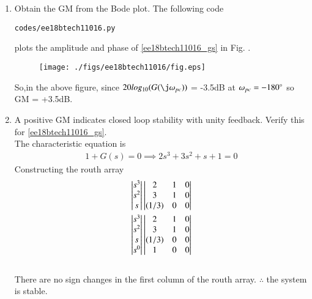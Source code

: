 \begin{enumerate}[label=\thesection.\arabic*.,ref=\thesection.\theenumi]
\item Obtain the GM from the Bode plot.
\solution The following code 
\begin{lstlisting}
codes/ee18btech11016.py
\end{lstlisting}
%
plots the amplitude and phase of \eqref{ee18btech11016_gs} in Fig. \label{fig:ee18btech11016}.
%
\begin{figure}[htp]
	\centering
	\texttt{[image: ./figs/ee18btech11016/fig.eps]}
	\caption{}
	\label{fig:ee18btech11016}
\end{figure}
So,in the above figure, since $20log_{10}(G(\j\omega_{pc}))$ = -3.5dB at $\omega_{pc} = -180\degree$ so GM = +3.5dB. 
\item A positive GM indicates closed loop stability with unity feedback.  Verify this for \eqref{ee18btech11016_gs}.
\\
\solution 
The characteristic equation is 
\begin{align}
1+G(s)=0 
\implies 2s^3 + 3s^2 + s + 1 = 0 
\end{align}
Constructing the routh array
\begin{align}
\begin{vmatrix}s^3\\s^2\\s\end{vmatrix}
\begin{vmatrix}2 & 1 & 0 \\ 3 & 1 & 0 \\ (1/3) & 0 & 0\end{vmatrix}
\\
\begin{vmatrix}s^3\\s^2\\s\\s^0\end{vmatrix}
\begin{vmatrix}2 & 1 & 0 \\ 3 & 1 & 0 \\ (1/3) & 0 & 0 \\ 1 & 0 & 0\end{vmatrix}
\end{align}\\
%
There are no sign changes in the first column of the routh array. 
$\therefore$ the system is stable.
\end{enumerate}


